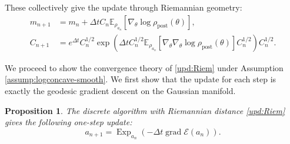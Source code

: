 \documentclass[11pt]{article}
\theoremstyle{plain}
\newtheorem{proposition}[theorem]{Proposition}
\theoremstyle{definition}
\theoremstyle{remark}
\newcommand{\E}{\mathbb{E}}
\newcommand{\post}{\mathrm{post}}
\newcommand{\grad}{\operatorname{grad}}
\newcommand{\Exp}{\operatorname{Exp}}
\begin{document}
These collectively give the update through Riemannian geometry:
\begin{equation}\label{upd:Riem}
    \begin{aligned}
        m_{n+1} &= m_n + \Delta t C_n \E_{\rho_{a_n}} [\nabla_\theta\log\rho_{\post}(\theta)], \\
        C_{n+1} &= e^{\Delta t} C_n^{1/2} \exp (\Delta t C_n^{1/2} \E_{\rho_{a_n}} [\nabla_\theta \nabla_\theta \log \rho_\post (\theta)] C_n^{1/2}) C_n^{1/2}.
    \end{aligned}
\end{equation}

We proceed to show the convergence theory of \eqref{upd:Riem} under Assumption \ref{assump:logconcave-smooth}. We first show that the update for each step is exactly the geodesic gradient descent on the Gaussian manifold.

\begin{proposition}\label{prop:upd-map-Riem}
    The discrete algorithm with Riemannian distance \eqref{upd:Riem} gives the following one-step update:
    \begin{equation*}
        a_{n+1} = \Exp_{a_n} (-\Delta t \grad \mathcal{E} (a_n)).
    \end{equation*}
\end{proposition}
\end{document}
